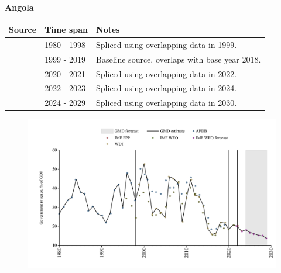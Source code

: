\documentclass[12pt,a4paper,landscape]{article}
\begin{document}
\begin{adjustbox}{max totalsize={\paperwidth}{\paperheight},center}
\begin{minipage}[t][\textheight][t]{\textwidth}
\vspace*{0.5cm}
{}
\begin{center}
{\Large\bfseries Angola}
\end{center}
\vspace{0.5cm}
\begin{table}[H]
\centering
\small
\begin{tabular}{|l|l|l|}
\hline
\textbf{Source} & \textbf{Time span} & \textbf{Notes} \\
\hline
\rowcolor{white}\cite{AFDB}& 1980 - 1998 &Spliced using overlapping data in 1999.\\
\rowcolor{lightgray}\cite{WDI}& 1999 - 2019 &Baseline source, overlaps with base year 2018.\\
\rowcolor{white}\cite{IMF_WEO}& 2020 - 2021 &Spliced using overlapping data in 2022.\\
\rowcolor{lightgray}\cite{IMF_FPP}& 2022 - 2023 &Spliced using overlapping data in 2024.\\
\rowcolor{white}\cite{IMF_WEO_forecast}& 2024 - 2029 &Spliced using overlapping data in 2030.\\
\hline
\end{tabular}
\end{table}
\begin{figure}[H]
\centering
\includegraphics[width=\textwidth,height=0.6\textheight,keepaspectratio]{graphs/AGO_govrev_GDP.pdf}
\end{figure}
\end{minipage}
\end{adjustbox}
\end{document}
